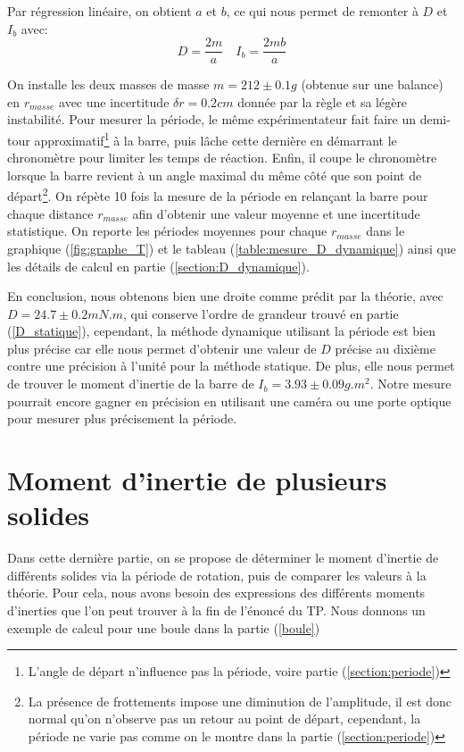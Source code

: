 \documentclass[12pt]{article}
\begin{document}
Par régression linéaire, on obtient $a$ et $b$, ce qui nous permet de remonter à $D$ et $I_b$ avec:
\begin{equation}
    D = \frac{2m}{a} \quad I_b = \frac{2mb}{a}
\end{equation}

On installe les deux masses de masse $m = 212 \pm 0.1g$ (obtenue sur une balance) en $r_{masse}$ avec une incertitude $\delta r = 0.2cm$ donnée par la règle et sa légère instabilité.
Pour mesurer la période, le même expérimentateur fait faire un demi-tour approximatif\footnote{L'angle de départ n'influence pas la période, voire partie (\ref{section:periode})} à la barre,
puis lâche cette dernière en démarrant le chronomètre pour limiter les temps de réaction. Enfin, il coupe le chronomètre lorsque la barre revient à un angle maximal du même côté que son point de
départ\footnote{La présence de frottements impose une diminution de l'amplitude, il est donc normal qu'on n'observe pas un retour au point de départ, cependant, 
la période ne varie pas comme on le montre dans la partie (\ref{section:periode})}. 
On répète 10 fois la mesure de la période en relançant la barre pour chaque distance $r_{masse}$ 
afin d'obtenir une valeur moyenne et une incertitude statistique. On reporte les périodes moyennes pour 
chaque $r_{masse}$ dans le graphique (\ref{fig:graphe_T}) et le tableau (\ref{table:mesure_D_dynamique}) ainsi que les détails de calcul en 
partie (\ref{section:D_dynamique}).

En conclusion, nous obtenons bien une droite comme prédit par la théorie, avec $D = 24.7 \pm 0.2 mN.m$, qui conserve l'ordre de grandeur trouvé en partie (\ref{D_statique}), cependant, la méthode
dynamique utilisant la période est bien plus précise car elle nous permet d'obtenir une valeur de $D$ précise au dixième contre une précision
à l'unité pour la méthode statique. De plus, elle nous permet de trouver le moment d'inertie de la barre de $I_b = 3.93 \pm 0.09g.m^2$. Notre mesure pourrait
encore gagner en précision en utilisant une caméra ou une porte optique pour mesurer plus précisement la période.

\break



\section{Moment d'inertie de plusieurs solides}
Dans cette dernière partie, on se propose de déterminer le moment d'inertie de différents solides via la période
de rotation, puis de comparer les valeurs à la théorie. Pour cela, nous avons besoin des expressions des différents moments d'inerties que l'on peut trouver à la fin de l'énoncé
du TP. Nous donnons un exemple de calcul pour une boule dans la partie (\ref{boule})
\end{document}
